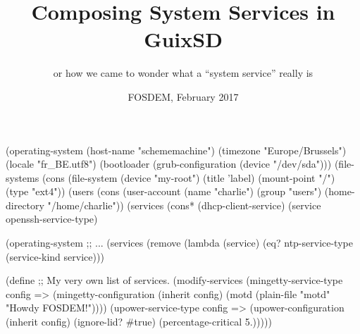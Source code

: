 \documentclass{beamer}
\title{Composing System Services in GuixSD}
\subtitle{or how we came to wonder what a ``system service'' really is}
\date{\small{FOSDEM, February 2017}}
\begin{document}
\maketitle


\begin{frame}[plain]
\end{frame}

\begin{frame}[fragile]
  \begin{semiverbatim}
    \small{
(\alert{operating-system}
  (host-name "schememachine")
  (timezone "Europe/Brussels")
  (locale "fr_BE.utf8")
  (bootloader (grub-configuration (device "/dev/sda")))
  (file-systems (cons (\alert{file-system}
                        (device "my-root")
                        (title 'label)
                        (mount-point "/")
                        (type "ext4"))
  (users (cons (\alert{user-account}
                 (name "charlie")
                 (group "users")
                 (home-directory "/home/charlie"))
  (services (cons* (dhcp-client-service)
                   (service openssh-service-type)
    }
  \end{semiverbatim}
\end{frame}

\begin{frame}[fragile]
  \begin{semiverbatim}
(\alert{operating-system}
  ;; \textrm{...}
  (services (remove (lambda (service)
                      (eq? ntp-service-type
                           (service-kind service)))
  \end{semiverbatim}
\end{frame}

\begin{frame}[fragile]
  \begin{semiverbatim}
(\alert{define} %
  ;; My very own list of services.
  (\alert{modify-services} %
    (mingetty-service-type config =>
                           (mingetty-configuration
                            (\alert{inherit} config)
                            (motd (plain-file "motd"
                                     "Howdy FOSDEM!"))))
    (upower-service-type config =>
                         (upower-configuration
                          (\alert{inherit} config)
                          (ignore-lid? #true)
                          (percentage-critical 5.)))))
  \end{semiverbatim}
\end{frame}
\end{document}

